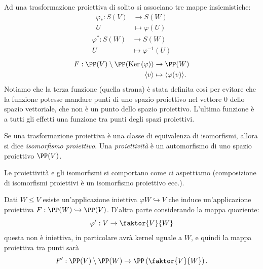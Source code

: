 \documentclass[11pt]{scrartcl}
\renewcommand{\ker}[1]{\text{Ker}\left(#1\right)}
\begin{document}
   	 Ad una trasformazione proiettiva di solito si associano tre mappe insiemistiche:
   	 \begin{align*}
   	 	\varphi_*:S(V)&\to  S(W) \\
   	 	U &\mapsto  \varphi(U)
   	 \end{align*}
   	 \begin{align*}
   	 	\varphi^*:S(W)&\to  S(W) \\
   	 	U & \mapsto  \varphi^{-1}(U)
   	 \end{align*}
   	 \begin{align*}
   	 	F:\PP(V)\setminus \PP(\ker{\varphi})&\to  \PP(W) \\
   	 	\langle v \rangle &\mapsto \langle \varphi(v)\rangle.
   	 \end{align*}
   	 Notiamo che la terza funzione (quella strana) è stata definita così per evitare che la funzione potesse mandare punti di uno spazio proiettivo nel vettore $0$ dello spazio vettoriale, che non è un punto dello spazio proiettivo. L'ultima funzione è a tutti gli effetti una funzione tra punti degli spazi proiettivi.
   	 \begin{definition}
   	 	Se una trasformazione proiettiva è una classe di equivalenza di isomorfismi, allora si dice \textit{isomorfismo proiettivo}. Una \textit{proiettività} è un automorfismo di uno spazio proiettivo $\PP(V)$.
   	 \end{definition}
   	 Le proiettività e gli isomorfismi si comportano come ci aspettiamo (composizione di isomorfismi proiettivi è un isomorfismo proiettivo ecc.).
   	 \begin{example}
   	 	Dati $W\le V$ esiste un'applicazione iniettiva 
   	 	$\varphi W\hookrightarrow V$ che induce un'applicazione proiettiva $F: \PP(W)\hookrightarrow \PP(V)$. D'altra parte considerando la mappa quoziente:
   	 	$$\varphi':V\to\faktor{V}{W}$$
   	 	questa non è iniettiva, in particolare avrà kernel uguale a $W$, e quindi la mappa proiettiva tra punti sarà
   	 	$$F':\PP(V)\setminus \PP(W)\to \PP\left(\faktor{V}{W}\right).$$
   	 \end{example}
\end{document}
